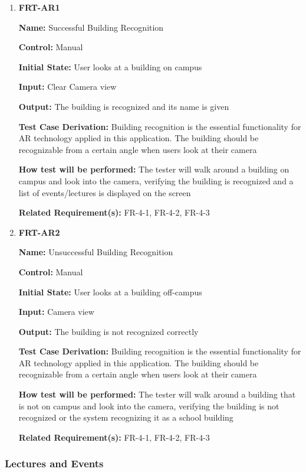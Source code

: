\documentclass[12pt, titlepage]{article}
\begin{document}
\begin{enumerate}
\item{\textbf{FRT-AR1}}

\textbf{Name:} Successful Building Recognition

\textbf{Control:} Manual
					
\textbf{Initial State:} User looks at a building on campus

\textbf{Input:} Clear Camera view
					
\textbf{Output:} The building is recognized and its name is given

\textbf{Test Case Derivation:} Building recognition is the essential functionality for AR technology applied in this application. The building should be recognizable from a certain angle when users look at their camera
					
\textbf{How test will be performed:} The tester will walk around a building on campus and look into the camera, verifying the building is recognized and a list of events/lectures is displayed on the screen

\textbf{Related Requirement(s):} FR-4-1, FR-4-2, FR-4-3

\item{\textbf{FRT-AR2}}

\textbf{Name:} Unsuccessful Building Recognition

\textbf{Control:} Manual
					
\textbf{Initial State:} User looks at a building off-campus

\textbf{Input:} Camera view
					
\textbf{Output:} The building is not recognized correctly

\textbf{Test Case Derivation:} Building recognition is the essential functionality for AR technology applied in this application. The building should be recognizable from a certain angle when users look at their camera
					
\textbf{How test will be performed:} The tester will walk around a building that is not on campus and look into the camera, verifying the building is not recognized or the system recognizing it as a school building

\textbf{Related Requirement(s):} FR-4-1, FR-4-2, FR-4-3
\end{enumerate}

\subsubsection{Lectures and Events}
\end{document}
